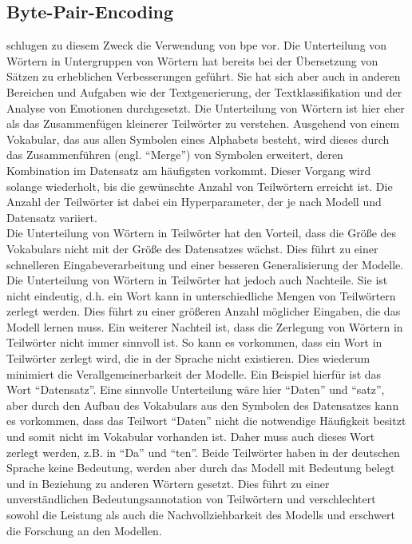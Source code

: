 \subsection{Byte-Pair-Encoding}\label{subsec:bpe}
\citet{bpe} schlugen zu diesem Zweck die Verwendung von \ac{bpe} vor.
Die Unterteilung von Wörtern in Untergruppen von Wörtern hat bereits bei der Übersetzung von Sätzen zu erheblichen Verbesserungen geführt. Sie hat sich aber auch in anderen Bereichen und Aufgaben wie der Textgenerierung, der Textklassifikation und der Analyse von Emotionen durchgesetzt.
Die Unterteilung von Wörtern ist hier eher als das Zusammenfügen kleinerer Teilwörter zu verstehen.
Ausgehend von einem Vokabular, das aus allen Symbolen eines Alphabets besteht, wird dieses durch das Zusammenführen (engl. \enquote{Merge}) von Symbolen erweitert, deren Kombination im Datensatz am häufigsten vorkommt.
Dieser Vorgang wird solange wiederholt, bis die gewünschte Anzahl von Teilwörtern erreicht ist.
Die Anzahl der Teilwörter ist dabei ein Hyperparameter, der je nach Modell und Datensatz variiert.\\

Die Unterteilung von Wörtern in Teilwörter hat den Vorteil, dass die Größe des Vokabulars nicht mit der Größe des Datensatzes wächst.
Dies führt zu einer schnelleren Eingabeverarbeitung und einer besseren Generalisierung der Modelle.
Die Unterteilung von Wörtern in Teilwörter hat jedoch auch Nachteile. Sie ist nicht eindeutig, d.h. ein Wort kann in unterschiedliche Mengen von Teilwörtern zerlegt werden.
Dies führt zu einer größeren Anzahl möglicher Eingaben, die das Modell lernen muss.
Ein weiterer Nachteil ist, dass die Zerlegung von Wörtern in Teilwörter nicht immer sinnvoll ist.
So kann es vorkommen, dass ein Wort in Teilwörter zerlegt wird, die in der Sprache nicht existieren.
Dies wiederum minimiert die Verallgemeinerbarkeit der Modelle.
Ein Beispiel hierfür ist das Wort \enquote{Datensatz}.
Eine sinnvolle Unterteilung wäre hier \enquote{Daten} und \enquote{satz}, aber durch den Aufbau des Vokabulars aus den Symbolen des Datensatzes kann es vorkommen, dass das Teilwort \enquote{Daten} nicht die notwendige Häufigkeit besitzt und somit nicht im Vokabular vorhanden ist.
Daher muss auch dieses Wort zerlegt werden, z.B. in \enquote{Da} und \enquote{ten}.
Beide Teilwörter haben in der deutschen Sprache keine Bedeutung, werden aber durch das Modell mit Bedeutung belegt und in Beziehung zu anderen Wörtern gesetzt.
Dies führt zu einer unverständlichen Bedeutungsannotation von Teilwörtern und verschlechtert sowohl die Leistung als auch die Nachvollziehbarkeit des Modells und erschwert die Forschung an den Modellen. 

